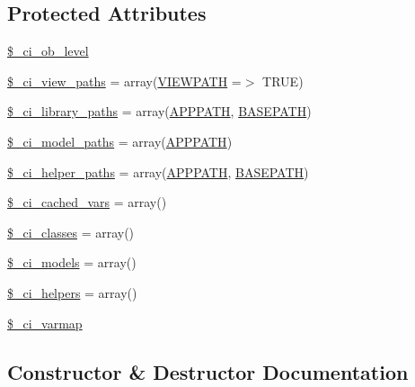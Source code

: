 \subsection*{Protected Attributes}
\begin{DoxyCompactItemize}
\item 
\hyperlink{class_c_i___loader_a499cf11349613b24142f9c13aa83ee1b}{\$\+\_\+ci\+\_\+ob\+\_\+level}
\item 
\hyperlink{class_c_i___loader_adc48c64c673b28c2447ea4214a27eeea}{\$\+\_\+ci\+\_\+view\+\_\+paths} = array(\hyperlink{index_8php_ade8921d52af58583e5727833459224c3}{V\+I\+E\+W\+P\+A\+T\+H} =$>$ T\+R\+U\+E)
\item 
\hyperlink{class_c_i___loader_a2cafeab35438db8fc21754e311b14e09}{\$\+\_\+ci\+\_\+library\+\_\+paths} = array(\hyperlink{_bootstrap_8php_a45cc636071e9edf22e5709d3c18bc84f}{A\+P\+P\+P\+A\+T\+H}, \hyperlink{index_8php_ad39801cabfd338dc5524466fe793fda9}{B\+A\+S\+E\+P\+A\+T\+H})
\item 
\hyperlink{class_c_i___loader_ac5f53015a6bd6ce67af5e30cb156cce4}{\$\+\_\+ci\+\_\+model\+\_\+paths} = array(\hyperlink{_bootstrap_8php_a45cc636071e9edf22e5709d3c18bc84f}{A\+P\+P\+P\+A\+T\+H})
\item 
\hyperlink{class_c_i___loader_a6ed0348d5a8afc689d71a234de8da95c}{\$\+\_\+ci\+\_\+helper\+\_\+paths} = array(\hyperlink{_bootstrap_8php_a45cc636071e9edf22e5709d3c18bc84f}{A\+P\+P\+P\+A\+T\+H}, \hyperlink{index_8php_ad39801cabfd338dc5524466fe793fda9}{B\+A\+S\+E\+P\+A\+T\+H})
\item 
\hyperlink{class_c_i___loader_a963cdc111da481606d2d67adf4c2947f}{\$\+\_\+ci\+\_\+cached\+\_\+vars} = array()
\item 
\hyperlink{class_c_i___loader_adad50876041bed7c7bf44aac03eb1162}{\$\+\_\+ci\+\_\+classes} = array()
\item 
\hyperlink{class_c_i___loader_adf3c08ef6905b17b2237bfa89d556f2c}{\$\+\_\+ci\+\_\+models} = array()
\item 
\hyperlink{class_c_i___loader_abc8797a91f1cdb473e2d0ad65dcbff55}{\$\+\_\+ci\+\_\+helpers} = array()
\item 
\hyperlink{class_c_i___loader_a8dd33a8ab99688451b1f811f122d1114}{\$\+\_\+ci\+\_\+varmap}
\end{DoxyCompactItemize}


\subsection{Constructor \& Destructor Documentation}
\hypertarget{class_c_i___loader_a095c5d389db211932136b53f25f39685}{}
